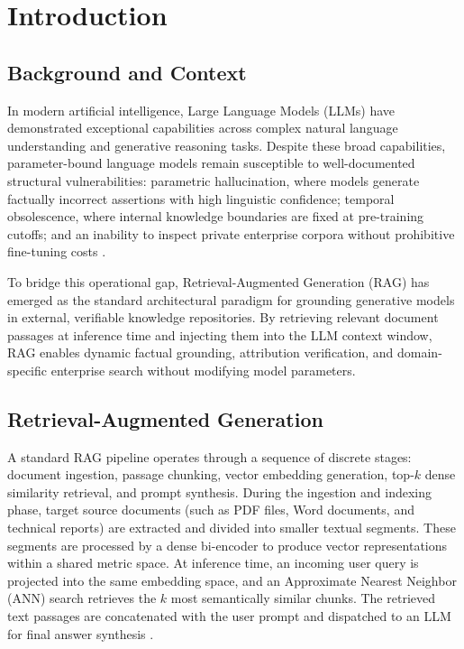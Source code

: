 \documentclass[12pt,a4paper]{report}
\begin{document}
\chapter{Introduction}

\section{Background and Context}
In modern artificial intelligence, Large Language Models (LLMs) have demonstrated exceptional capabilities across complex natural language understanding and generative reasoning tasks. Despite these broad capabilities, parameter-bound language models remain susceptible to well-documented structural vulnerabilities: parametric hallucination, where models generate factually incorrect assertions with high linguistic confidence; temporal obsolescence, where internal knowledge boundaries are fixed at pre-training cutoffs; and an inability to inspect private enterprise corpora without prohibitive fine-tuning costs \cite{lewis2020rag,guu2020realm}. 

To bridge this operational gap, Retrieval-Augmented Generation (RAG) has emerged as the standard architectural paradigm for grounding generative models in external, verifiable knowledge repositories. By retrieving relevant document passages at inference time and injecting them into the LLM context window, RAG enables dynamic factual grounding, attribution verification, and domain-specific enterprise search without modifying model parameters.

\section{Retrieval-Augmented Generation}
A standard RAG pipeline operates through a sequence of discrete stages: document ingestion, passage chunking, vector embedding generation, top-$k$ dense similarity retrieval, and prompt synthesis. During the ingestion and indexing phase, target source documents (such as PDF files, Word documents, and technical reports) are extracted and divided into smaller textual segments. These segments are processed by a dense bi-encoder to produce vector representations within a shared metric space. At inference time, an incoming user query is projected into the same embedding space, and an Approximate Nearest Neighbor (ANN) search retrieves the $k$ most semantically similar chunks. The retrieved text passages are concatenated with the user prompt and dispatched to an LLM for final answer synthesis \cite{borgeaud2022retro,izacard2023atlas}.
\end{document}
